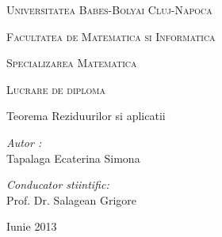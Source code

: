 \begin{titlepage}
    \begin{center}
    {\large \textsc{Universitatea Babes-Bolyai Cluj-Napoca} \par
            \textsc{Facultatea de Matematica si Informatica} \par
            \textsc{Specializarea Matematica} \par }

    \vfill
    
    {\LARGE \textsc{Lucrare de diploma}}
    \null\vskip 1cm
    
    {\huge{Teorema Reziduurilor si aplicatii \par }}           

    \vfill

    \begin{minipage}[b]{0.51\linewidth}
        {\large \emph{Autor :}\\
            Tapalaga Ecaterina Simona}
    \end{minipage}
    \begin{minipage}[b]{0.48\linewidth}
        \begin{flushright}
            {\large \emph{Conducator stiintific:}\\
                Prof. Dr. Salagean Grigore}
        \end{flushright}
     \end{minipage}

    \vfill
    {\large \par Iunie 2013 \par}
    \end{center}
\end{titlepage}

\clearpage